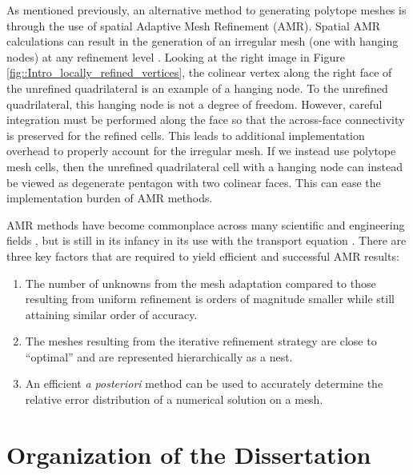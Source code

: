 As mentioned previously, an alternative method to generating polytope meshes is through the use of spatial Adaptive Mesh Refinement (AMR). Spatial AMR calculations can result in the generation of an irregular mesh (one with hanging nodes) at any refinement level \cite{carey1997computational,plewa2005adaptive}. Looking at the right image in Figure \ref{fig::Intro_locally_refined_vertices}, the colinear vertex along the right face of the unrefined quadrilateral is an example of a hanging node. To the unrefined quadrilateral, this hanging node is not a degree of freedom. However, careful integration must be performed along the face so that the across-face connectivity is preserved for the refined cells. This leads to additional implementation overhead to properly account for the irregular mesh. If we instead use polytope mesh cells, then the unrefined quadrilateral cell with a hanging node can instead be viewed as degenerate pentagon with two colinear faces. This can ease the implementation burden of AMR methods.

AMR methods have become commonplace across many scientific and engineering fields \cite{plewa2005adaptive,carey1997computational,ramm2003error,karniadakis2013spectral,schwab1998p,solin2003higher}, but is still in its infancy in its use with the transport equation \cite{fuhrer1997posteriori,hartmann2002adaptive,dedner2002adaptive,hartmann2003adaptive,ragusa2010two,wang2011standard}. There are three key factors that are required to yield efficient and successful AMR results:

\begin{enumerate}
\item The number of unknowns from the mesh adaptation compared to those resulting from uniform refinement is orders of magnitude smaller while still attaining similar order of accuracy.
\item The meshes resulting from the iterative refinement strategy are close to ``optimal'' and are represented hierarchically as a nest.
\item An efficient {\em a posteriori} method can be used to accurately determine the relative error distribution of a numerical solution on a mesh.
\end{enumerate}

\section{Organization of the Dissertation}
\label{sec::Intro_Organization}

